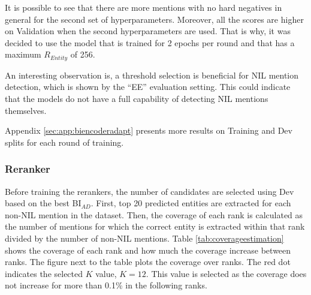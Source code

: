 \documentclass{report}
\theoremstyle{definition}
\theoremstyle{remark}
\begin{document}
It is possible to see that there are more mentions with no hard negatives in general for the second set of hyperparameters. Moreover, all the scores are higher on Validation when the second hyperparameters are used. That is why, it was decided to use the model that is trained for 2 epochs per round and that has a maximum $R_{Entity}$ of 256.

An interesting observation is, a threshold selection is beneficial for NIL mention detection, which is shown by the ``EE'' evaluation setting. This could indicate that the models do not have a full capability of detecting NIL mentions themselves. 

Appendix \ref{sec:app:biencoderadapt} presents more results on Training and Dev splits for each round of training.
\subsubsection{Reranker}
Before training the rerankers, the number of candidates are selected using Dev based on the best BI$_{AD}$. First, top 20 predicted entities are extracted for each non-NIL mention in the dataset. Then, the coverage of each rank is calculated as the number of mentions for which the correct entity is extracted within that rank divided by the number of non-NIL mentions. Table \ref{tab:coverageestimation} shows the coverage of each rank and how much the coverage increase between ranks. The figure next to the table plots the coverage over ranks. The red dot indicates the selected $K$ value, $K=12$. This value is selected as the coverage does not increase for more than 0.1\% in the following ranks.
\end{document}
